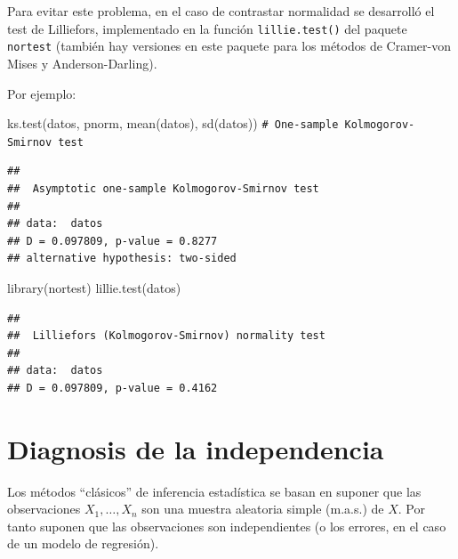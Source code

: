 \documentclass[
]{book}
\newenvironment{Shaded}{\begin{snugshade}}{\end{snugshade}}
\newcommand{\CommentTok}[1]{\textcolor[rgb]{0.56,0.35,0.01}{\textit{#1}}}
\newcommand{\FunctionTok}[1]{\textcolor[rgb]{0.00,0.00,0.00}{#1}}
\newcommand{\NormalTok}[1]{#1}
\theoremstyle{break}
\theoremstyle{nonumberplain}
\renewcommand{\CommentTok}[1]{\textcolor[rgb]{0.41,0.41,0.41}{\texttt{#1}}}
\begin{document}
Para evitar este problema, en el caso de contrastar normalidad se desarrolló el test
de Lilliefors, implementado en la función \texttt{lillie.test()} del paquete \texttt{nortest}
(también hay versiones en este paquete para los métodos de Cramer-von Mises y
Anderson-Darling).

Por ejemplo:

\begin{Shaded}
\begin{Highlighting}[]
\FunctionTok{ks.test}\NormalTok{(datos, pnorm, }\FunctionTok{mean}\NormalTok{(datos), }\FunctionTok{sd}\NormalTok{(datos)) }\CommentTok{\# One{-}sample Kolmogorov{-}Smirnov test}
\end{Highlighting}
\end{Shaded}

\begin{verbatim}
## 
##  Asymptotic one-sample Kolmogorov-Smirnov test
## 
## data:  datos
## D = 0.097809, p-value = 0.8277
## alternative hypothesis: two-sided
\end{verbatim}

\begin{Shaded}
\begin{Highlighting}[]
\FunctionTok{library}\NormalTok{(nortest)}
\FunctionTok{lillie.test}\NormalTok{(datos)}
\end{Highlighting}
\end{Shaded}

\begin{verbatim}
## 
##  Lilliefors (Kolmogorov-Smirnov) normality test
## 
## data:  datos
## D = 0.097809, p-value = 0.4162
\end{verbatim}

\hypertarget{diag-aleat}{%
\section{Diagnosis de la independencia}\label{diag-aleat}}

Los métodos ``clásicos'' de inferencia estadística se basan en
suponer que las observaciones \(X_{1},\ldots,X_{n}\) son una muestra
aleatoria simple (m.a.s.) de \(X\). Por tanto suponen que
las observaciones son independientes (o los errores, en el caso de un
modelo de regresión).
\end{document}
